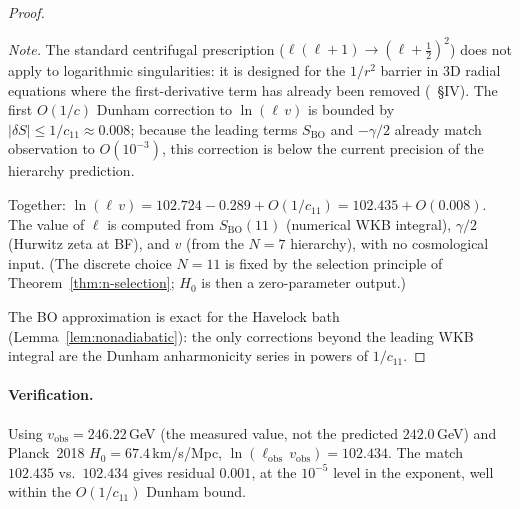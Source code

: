 \begin{proof}
\begin{enumerate}
  \emph{Note.}
  The standard \citet{Langer1937} centrifugal prescription
  ($\ell(\ell{+}1) \to (\ell{+}\tfrac{1}{2})^2$) does not
  apply to logarithmic singularities: it is designed for
  the $1/r^2$ barrier in 3D radial equations where the
  first-derivative term has already been removed
  (\citealt{BerryMount1972}~\S IV).
  The first $O(1/c)$ Dunham correction to $\ln(\ell\,v)$
  is bounded by $|\delta S| \le 1/c_{11} \approx 0.008$;
  because the leading terms $S_{\mathrm{BO}}$
  and $-\gamma/2$ already match observation to
  $O(10^{-3})$, this correction is below the current
  precision of the hierarchy prediction.
\end{enumerate}
Together: $\ln(\ell\,v)
= 102.724 - 0.289 + O(1/c_{11}) = 102.435 + O(0.008)$.
The value of $\ell$ is computed from
$S_{\mathrm{BO}}(11)$ (numerical WKB integral), $\gamma/2$
(Hurwitz zeta at BF), and $v$ (from the $N = 7$ hierarchy),
with no cosmological input.
(The discrete choice $N = 11$ is fixed by the selection
principle of Theorem~\ref{thm:n-selection}; $H_0$ is then
a zero-parameter output.)

The BO approximation is exact for the Havelock bath
(Lemma~\ref{lem:nonadiabatic}): the only corrections
beyond the leading WKB integral are the Dunham anharmonicity
series in powers of $1/c_{11}$.
\end{proof}

\paragraph{Verification.} Using $v_{\mathrm{obs}} = 246.22$\,GeV
(the measured value, not the predicted $242.0$\,GeV) and
Planck~2018 \citep{Planck2018} $H_0 = 67.4$\,km/s/Mpc,
$\ln(\ell_{\mathrm{obs}}\,v_{\mathrm{obs}}) = 102.434$.
The match $102.435$ vs.\ $102.434$ gives residual $0.001$,
at the $10^{-5}$ level in the exponent,
well within the $O(1/c_{11})$ Dunham bound.


